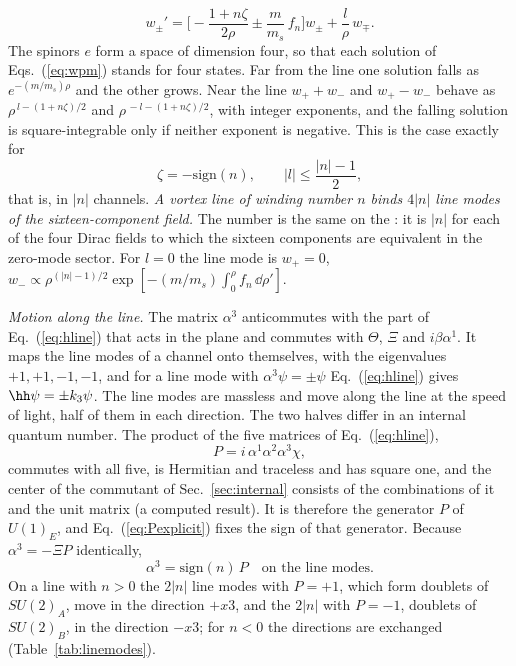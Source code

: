 \begin{equation}
w_\pm'=\Big[-\frac{1+n\zeta}{2\rho}\pm\frac{m}{m_s}\,f_n\Big]w_\pm+\frac{l}{\rho}\,w_\mp .
\label{eq:wpm}
\end{equation}
The spinors $e$ form a space of dimension four, so that each solution of Eqs.~(\ref{eq:wpm})
stands for four states. Far from the line one solution falls as $e^{-(m/m_s)\rho}$ and the other
grows. Near the line $w_++w_-$ and $w_+-w_-$ behave as $\rho^{\,l-(1+n\zeta)/2}$ and
$\rho^{\,-l-(1+n\zeta)/2}$, with integer exponents, and the falling solution is square-integrable
only if neither exponent is negative. This is the case exactly for
\begin{equation}
\zeta=-\mathrm{sign}(n),\qquad|l|\le\frac{|n|-1}{2},
\label{eq:linechannels}
\end{equation}
that is, in $|n|$ channels. \emph{A vortex line of winding number $n$ binds $4|n|$ line modes of
the sixteen-component field.} The number is the same on the
:
it is $|n|$ for each of the four Dirac fields to which
the sixteen components are equivalent in the zero-mode sector. For $l=0$ the line mode is
$w_+=0$, $w_-\propto\rho^{(|n|-1)/2}\exp[-(m/m_s)\int_0^\rho f_n\,\dd\rho']$.

\emph{Motion along the line.} The matrix $\alpha^3$ anticommutes with the part of
Eq.~(\ref{eq:hline}) that acts in the plane and commutes with $\Theta$, $\Xi$ and $i\beta\alpha^1$.
It maps the line modes of a channel onto themselves, with the eigenvalues $+1,+1,-1,-1$, and for
a line mode with $\alpha^3\psi=\pm\psi$ Eq.~(\ref{eq:hline}) gives $\hh\psi=\pm k_3\psi$. The line
modes are massless and move along the line at the speed of light, half of them in each direction.
The two halves differ in an internal quantum number. The product of the five matrices of
Eq.~(\ref{eq:hline}),
\begin{equation}
P=i\,\alpha^1\alpha^2\alpha^3\chi ,
\label{eq:Pexplicit}
\end{equation}
commutes with all five, is Hermitian and traceless and has square one, and the center of the
commutant of Sec.~\ref{sec:internal} consists of the combinations of it and the unit matrix (a
computed result). It is therefore the generator $P$ of $U(1)_E$, and Eq.~(\ref{eq:Pexplicit})
fixes the sign of that generator. Because $\alpha^3=-\Xi P$ identically,
\begin{equation}
\alpha^3=\mathrm{sign}(n)\,P\quad\text{on the line modes.}
\label{eq:direction}
\end{equation}
On a line with $n>0$ the $2|n|$ line modes with $P=+1$, which form doublets of $SU(2)_A$, move in
the direction $+x3$, and the $2|n|$ with $P=-1$, doublets of $SU(2)_B$, in the direction $-x3$; for
$n<0$ the directions are exchanged (Table~\ref{tab:linemodes}).

